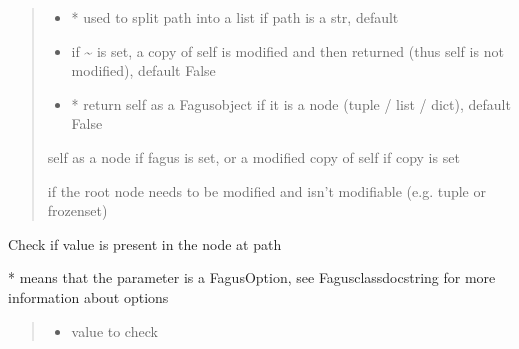 \documentclass[a4paper,10pt,english]{sphinxmanual}
\begin{document}
\begin{fulllineitems}
\begin{fulllineitems}
\begin{quote}
\begin{description}
\begin{itemize}
\item {}
\sphinxAtStartPar
{} \textendash{} * used to split path into a list if path is a str, default 

\item {}
\sphinxAtStartPar
{} \textendash{} if \textasciitilde{} is set, a copy of self is modified and then returned (thus self is not modified), default False

\item {}
\sphinxAtStartPar
{} \textendash{} * return self as a Fagus\sphinxhyphen{}object if it is a node (tuple / list / dict), default False

\end{itemize}

\sphinxAtStartPar
self as a node if fagus is set, or a modified copy of self if copy is set

\sphinxAtStartPar
{} \textendash{} if the root node needs to be modified and isn’t modifiable (e.g. tuple or frozenset)

\end{description}\end{quote}

\end{fulllineitems}


\begin{fulllineitems}
\label{\detokenize{fagus:fagus.Fagus.contains}}
\pysigstartsignatures
{}
\pysigstopsignatures
\sphinxAtStartPar
Check if value is present in the node at path

\sphinxAtStartPar
* means that the parameter is a FagusOption, see Fagus\sphinxhyphen{}class\sphinxhyphen{}docstring for more information about options
\begin{quote}\begin{description}
\begin{itemize}
\item {}
\sphinxAtStartPar
{} \textendash{} value to check


\end{itemize}
\end{description}
\end{quote}
\end{fulllineitems}
\end{fulllineitems}
\end{document}
